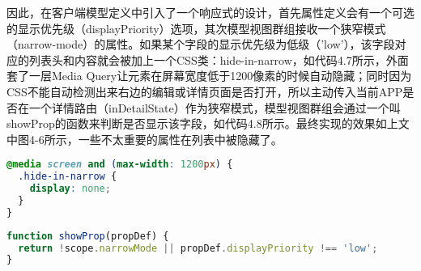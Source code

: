 因此，在客户端模型定义中引入了一个响应式的设计，首先属性定义会有一个可选的显示优先级（displayPriority）选项，其次模型视图群组接收一个狭窄模式（narrow-mode）的属性。如果某个字段的显示优先级为低级（'low'），该字段对应的列表头和内容就会被加上一个CSS类：hide-in-narrow，如代码4.7所示，外面套了一层Media Query让元素在屏幕宽度低于1200像素的时候自动隐藏；同时因为CSS不能自动检测出来右边的编辑或详情页面是否打开，所以主动传入当前APP是否在一个详情路由（inDetailState）作为狭窄模式，模型视图群组会通过一个叫showProp的函数来判断是否显示该字段，如代码4.8所示。最终实现的效果如上文中图4-6所示，一些不太重要的属性在列表中被隐藏了。
\begin{lstlisting}[language={CSS}, caption={CSS类hide-in-narrow的代码}]
@media screen and (max-width: 1200px) {
  .hide-in-narrow {
    display: none;
  }
}
\end{lstlisting}

\begin{lstlisting}[language={JavaScript}, caption={传感器列表页面中的模型输入群组代码}]
function showProp(propDef) {
  return !scope.narrowMode || propDef.displayPriority !== 'low';
}
\end{lstlisting}
